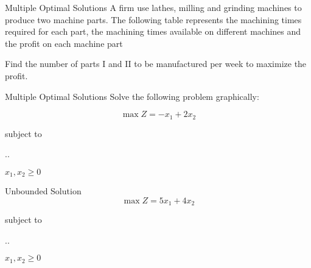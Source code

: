   \begin{frameExample}{Multiple Optimal Solutions}{}
    A firm use lathes, milling and grinding machines to produce two machine parts. The following table represents the machining times required for each part, the machining times available on different machines and the profit on each machine part

    {
      \centering
      \par
    }

    Find the number of parts I and II to be manufactured per week to maximize the profit.
  \end{frameExample}


  \begin{frameExample}{Multiple Optimal Solutions}{}
    Solve the following problem graphically:

    \[ \max Z = -x_1 + 2x_2 \]

  {\centering
    subject to

    \sysdelim..

    \vspace{5mm}

    $x_1, x_2 \geq 0$
    \par}
  \end{frameExample}

  \begin{frameExample}{Unbounded Solution}{}
    \[ \max Z = 5x_1 + 4x_2\]

    {\centering
      subject to

      \vspace{3mm}

      \sysdelim..%

      \vspace{3mm}
      $x_1, x_2 \geq 0$
    \par}
  \end{frameExample}

